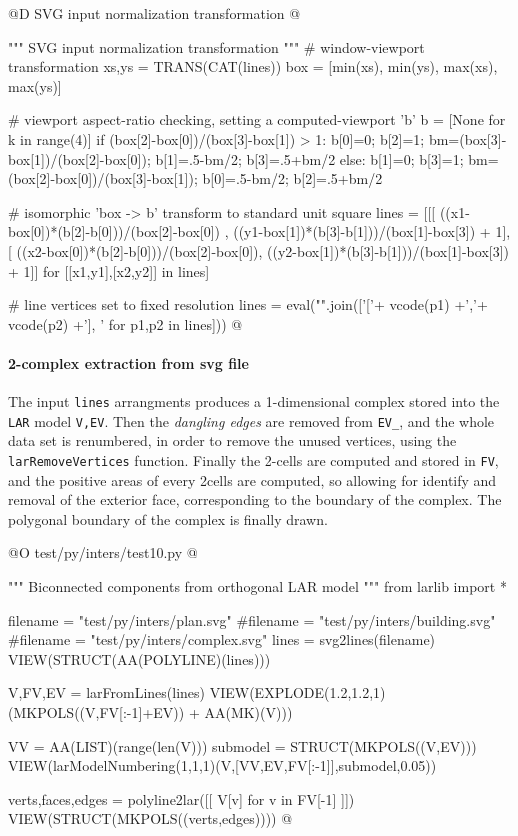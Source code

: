 \documentclass[11pt,oneside]{article}    %
\begin{document}
@D SVG input normalization transformation
@{""" SVG input normalization transformation """
# window-viewport transformation
xs,ys = TRANS(CAT(lines))
box = [min(xs), min(ys), max(xs), max(ys)]

# viewport aspect-ratio checking, setting a computed-viewport 'b'
b = [None for k in range(4)]
if (box[2]-box[0])/(box[3]-box[1]) > 1:  
    b[0]=0; b[2]=1; bm=(box[3]-box[1])/(box[2]-box[0]); b[1]=.5-bm/2; b[3]=.5+bm/2
else: 
    b[1]=0; b[3]=1; bm=(box[2]-box[0])/(box[3]-box[1]); b[0]=.5-bm/2; b[2]=.5+bm/2

# isomorphic 'box -> b' transform to standard unit square
lines = [[[ 
((x1-box[0])*(b[2]-b[0]))/(box[2]-box[0]) , 
((y1-box[1])*(b[3]-b[1]))/(box[1]-box[3]) + 1], [
((x2-box[0])*(b[2]-b[0]))/(box[2]-box[0]), 
((y2-box[1])*(b[3]-b[1]))/(box[1]-box[3]) + 1]]  
      for [[x1,y1],[x2,y2]] in lines]

# line vertices set to fixed resolution
lines = eval("".join(['['+ vcode(p1) +','+ vcode(p2) +'], ' for p1,p2 in lines]))
@}


\paragraph{2-complex extraction from svg file}
The input \texttt{lines} arrangments produces a 1-dimensional complex stored into the \texttt{LAR} model \texttt{V,EV}. Then the \emph{dangling edges} are removed from \texttt{EV\_},
and the whole data set is renumbered, in order to remove the unused vertices, using the \texttt{larRemoveVertices} function.
Finally the 2-cells are computed and stored in \texttt{FV}, and the positive areas of every 2cells are computed, so allowing for identify and removal of the exterior face, 
corresponding to the boundary of the complex.
The polygonal boundary of the complex is finally drawn.

@O test/py/inters/test10.py
@{""" Biconnected components from orthogonal LAR model """
from larlib import *

filename = "test/py/inters/plan.svg"
#filename = "test/py/inters/building.svg"
#filename = "test/py/inters/complex.svg"
lines = svg2lines(filename)
VIEW(STRUCT(AA(POLYLINE)(lines)))
    
V,FV,EV = larFromLines(lines)
VIEW(EXPLODE(1.2,1.2,1)(MKPOLS((V,FV[:-1]+EV)) + AA(MK)(V)))

VV = AA(LIST)(range(len(V)))
submodel = STRUCT(MKPOLS((V,EV)))
VIEW(larModelNumbering(1,1,1)(V,[VV,EV,FV[:-1]],submodel,0.05))


verts,faces,edges = polyline2lar([[ V[v] for v in FV[-1] ]])
VIEW(STRUCT(MKPOLS((verts,edges))))
@}
\end{document}
